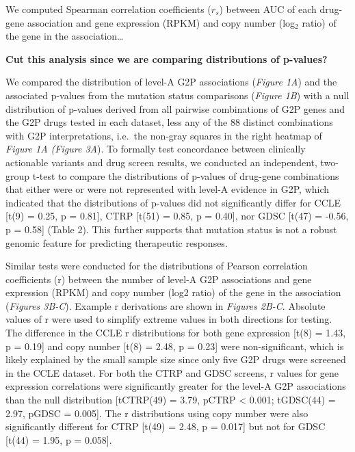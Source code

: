 \documentclass[man,floatsintext]{apa6}
\begin{document}
We computed Spearman correlation coefficients (\(r_s\)) between AUC of
each drug-gene association and gene expression (RPKM) and copy number
(log\(_2\) ratio) of the gene in the association\ldots{}

\textbf{Cut this analysis since we are comparing distributions of
p-values?}

We compared the distribution of level-A G2P associations (\emph{Figure
1A}) and the associated p-values from the mutation status comparisons
(\emph{Figure 1B}) with a null distribution of p-values derived from all
pairwise combinations of G2P genes and the G2P drugs tested in each
dataset, less any of the 88 distinct combinations with G2P
interpretations, i.e.~the non-gray squares in the right heatmap of
\emph{Figure 1A (Figure 3A}). To formally test concordance between
clinically actionable variants and drug screen results, we conducted an
independent, two-group t-test to compare the distributions of p-values
of drug-gene combinations that either were or were not represented with
level-A evidence in G2P, which indicated that the distributions of
p-values did not significantly differ for CCLE {[}t(9) = 0.25, p =
0.81{]}, CTRP {[}t(51) = 0.85, p = 0.40{]}, nor GDSC {[}t(47) = -0.56, p
= 0.58{]} (Table 2). This further supports that mutation status is not a
robust genomic feature for predicting therapeutic responses.

Similar tests were conducted for the distributions of Pearson
correlation coefficients (r) between the number of level-A G2P
associations and gene expression (RPKM) and copy number (log2 ratio) of
the gene in the association (\emph{Figures 3B-C}). Example r derivations
are shown in \emph{Figures 2B-C}. Absolute values of r were used to
simplify extreme values in both directions for testing. The difference
in the CCLE \textbar{}r\textbar{} distributions for both gene expression
{[}t(8) = 1.43, p = 0.19{]} and copy number {[}t(8) = 2.48, p = 0.23{]}
were non-significant, which is likely explained by the small sample size
since only five G2P drugs were screened in the CCLE dataset. For both
the CTRP and GDSC screens, \textbar{}r\textbar{} values for gene
expression correlations were significantly greater for the level-A G2P
associations than the null distribution {[}tCTRP(49) = 3.79, pCTRP
\textless{} 0.001; tGDSC(44) = 2.97, pGDSC = 0.005{]}. The
\textbar{}r\textbar{} distributions using copy number were also
significantly different for CTRP {[}t(49) = 2.48, p = 0.017{]} but not
for GDSC {[}t(44) = 1.95, p = 0.058{]}.
\end{document}
